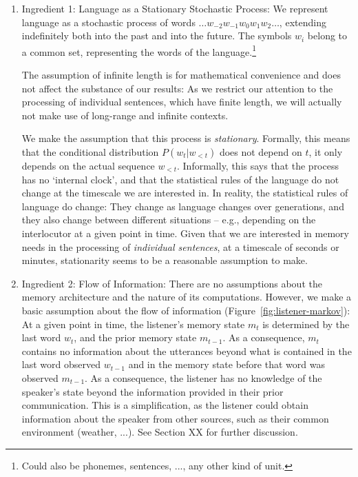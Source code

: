 \begin{enumerate}
\item Ingredient 1: Language as a Stationary Stochastic Process:
We represent language as a stochastic process of words $\dots w_{-2} w_{-1} w_0 w_{1} w_{2} \dots$, extending indefinitely both into the past and into the future.
The symbols $w_i$ belong to a common set, representing the words of the language.\footnote{Could also be phonemes, sentences, ..., any other kind of unit.}

The assumption of infinite length is for mathematical convenience and does not affect the substance of our results:
As we restrict our attention to the processing of individual sentences, which have finite length, we will actually not make use of long-range and infinite contexts.

We make the assumption that this process is \emph{stationary}.
Formally, this means that the conditional distribution $P(w_t|w_{<t})$ does not depend on $t$, it only depends on the actual sequence $w_{<t}$.
Informally, this says that the process has no `internal clock', and that the statistical rules of the language do not change at the timescale we are interested in.
In reality, the statistical rules of language do change: They change as language changes over generations, and they also change between different situations -- e.g., depending on the interlocutor at a given point in time.
Given that we are interested in memory needs in the processing of \emph{individual sentences}, at a timescale of seconds or minutes, stationarity seems to be a reasonable assumption to make.

\item Ingredient 2: Flow of Information: There are no assumptions about the memory architecture and the nature of its computations.
However, we make a basic assumption about the flow of information (Figure~\ref{fig:listener-markov}):
At a given point in time, the listener's memory state $m_t$ is determined by the last word $w_t$, and the prior memory state $m_{t-1}$.
As a consequence, $m_t$ contains no information about the utterances beyond what is contained in the last word observed $w_{t-1}$ and in the memory state before that word was observed $m_{t-1}$.
As a consequence, the listener has no knowledge of the speaker's state beyond the information provided in their prior communication.
This is a simplification, as the listener could obtain information about the speaker from other sources, such as their common environment (weather, ...).
See Section XX for further discussion.
\end{enumerate}






